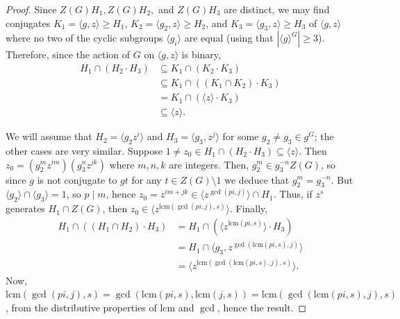 \documentclass[10pt,a4paper]{amsart}
\newcommand\lcm{\mathrm{lcm}}
\begin{document}
\begin{proof}
     Since $Z(G)H_1,Z(G) H_2,$ and $Z(G)H_3$ are distinct, we may find conjugates $K_1=\langle g,z\rangle\geq H_1$, $K_2=\langle g_2,z\rangle\geq H_2$, and $K_3=\langle g_3,z\rangle\geq H_3$ of $\langle g,z\rangle$ where no two of the cyclic subgroups $\langle g_i\rangle$ are equal (using that $|\langle g\rangle^G|\geq 3$). Therefore, since the action of $G$ on $\langle g,z\rangle $ is binary, \begin{align*}
            H_1\cap (H_2\cdot H_3)&\subseteq K_1\cap (K_2\cdot K_3)\\&\subseteq K_1\cap ((K_1\cap K_2)\cdot K_3)\\&=K_1\cap (\langle z\rangle\cdot K_3)\\&\subseteq\langle z\rangle.
        \end{align*}
    
     We will assume that $H_2=\langle g_2z^i\rangle$ and $H_3=\langle g_3,z^j\rangle$ for some $g_2\ne g_3\in g^G$; the other cases are very similar. Suppose $1\ne z_0\in H_1\cap (H_2\cdot H_3)\subseteq\langle z\rangle$. Then $z_0=(g_2^mz^{im})(g_3^nz^{jk})$ where $m,n,k$ are integers. Then, $g_2^m\in g_3^{-n}Z(G)$, so since $g$ is not conjugate to $gt$ for any $t\in Z(G)\setminus{1}$ we deduce that $g_2^m=g_3^{-n}$. But $\langle g_2\rangle\cap\langle g_3\rangle=1$, so $p\mid m$, hence $z_0=z^{im+jk}\in \langle z^{\gcd(pi,j)}\rangle\cap H_1$. Thus, if $z^s$ generates $H_1\cap Z(G)$, then $z_0\in \langle z^{\lcm(\gcd(pi,j),s)}\rangle$.
    Finally, \begin{align*}
             H_1\cap ((H_1\cap H_2)\cdot H_3)&= H_1\cap (\langle z^{\lcm(pi,s)}\rangle\cdot H_3)\\&=H_1\cap \langle g_3,z^{\gcd(\lcm(pi,s),j)}\rangle\\&= \langle z^{\lcm(\gcd(\lcm(pi,s),j),s)}\rangle.
        \end{align*}
    Now, $\lcm(\gcd(pi,j),s)=\gcd(\lcm(pi,s),\lcm(j,s))=\lcm(\gcd(\lcm(pi,s),j),s)$, from the distributive properties of $\lcm$ and $\gcd$, hence the result.
   \end{proof}
\end{document}
